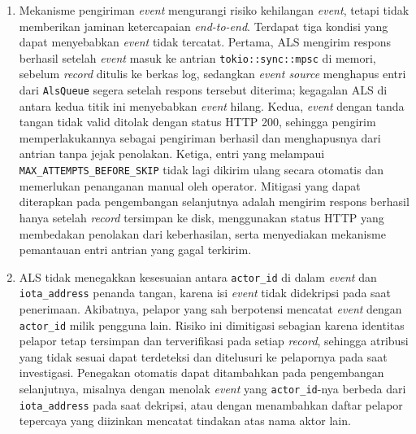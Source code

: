 \begin{enumerate}
    \item Mekanisme pengiriman \textit{event} mengurangi risiko kehilangan \textit{event}, tetapi tidak memberikan jaminan ketercapaian \textit{end-to-end}. Terdapat tiga kondisi yang dapat menyebabkan \textit{event} tidak tercatat. Pertama, ALS mengirim respons berhasil setelah \textit{event} masuk ke antrian \texttt{tokio::sync::mpsc} di memori, sebelum \textit{record} ditulis ke berkas log, sedangkan \textit{event source} menghapus entri dari \texttt{AlsQueue} segera setelah respons tersebut diterima; kegagalan ALS di antara kedua titik ini menyebabkan \textit{event} hilang. Kedua, \textit{event} dengan tanda tangan tidak valid ditolak dengan status HTTP 200, sehingga pengirim memperlakukannya sebagai pengiriman berhasil dan menghapusnya dari antrian tanpa jejak penolakan. Ketiga, entri yang melampaui \texttt{MAX\_ATTEMPTS\_BEFORE\_SKIP} tidak lagi dikirim ulang secara otomatis dan memerlukan penanganan manual oleh operator. Mitigasi yang dapat diterapkan pada pengembangan selanjutnya adalah mengirim respons berhasil hanya setelah \textit{record} tersimpan ke disk, menggunakan status HTTP yang membedakan penolakan dari keberhasilan, serta menyediakan mekanisme pemantauan entri antrian yang gagal terkirim.
    
    \item ALS tidak menegakkan kesesuaian antara \texttt{actor\_id} di dalam
    \textit{event} dan \texttt{iota\_address} penanda tangan, karena isi
    \textit{event} tidak didekripsi pada saat penerimaan. Akibatnya, pelapor
    yang sah berpotensi mencatat \textit{event} dengan \texttt{actor\_id} milik
    pengguna lain. Risiko ini dimitigasi sebagian karena identitas pelapor
    tetap tersimpan dan terverifikasi pada setiap \textit{record}, sehingga
    atribusi yang tidak sesuai dapat terdeteksi dan ditelusuri ke pelapornya
    pada saat investigasi. Penegakan otomatis dapat ditambahkan pada
    pengembangan selanjutnya, misalnya dengan menolak \textit{event} yang
    \texttt{actor\_id}-nya berbeda dari \texttt{iota\_address} pada saat
    dekripsi, atau dengan menambahkan daftar pelapor tepercaya yang diizinkan
    mencatat tindakan atas nama aktor lain.


\end{enumerate}
